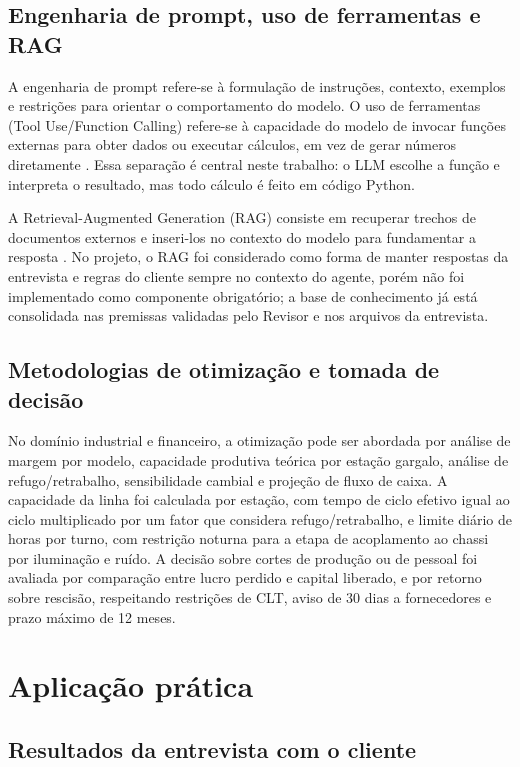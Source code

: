 \documentclass[12pt,a4paper,oneside,brazil]{abntex2}
\begin{document}
\section{Engenharia de prompt, uso de ferramentas e RAG}

A engenharia de prompt refere-se à formulação de instruções, contexto, exemplos e restrições para orientar o comportamento do modelo. O uso de ferramentas (Tool Use/Function Calling) refere-se à capacidade do modelo de invocar funções externas para obter dados ou executar cálculos, em vez de gerar números diretamente \cite{schick2023toolformer}. Essa separação é central neste trabalho: o LLM escolhe a função e interpreta o resultado, mas todo cálculo é feito em código Python.

A Retrieval-Augmented Generation (RAG) consiste em recuperar trechos de documentos externos e inseri-los no contexto do modelo para fundamentar a resposta \cite{lewis2020retrieval}. No projeto, o RAG foi considerado como forma de manter respostas da entrevista e regras do cliente sempre no contexto do agente, porém não foi implementado como componente obrigatório; a base de conhecimento já está consolidada nas premissas validadas pelo Revisor e nos arquivos da entrevista.

\section{Metodologias de otimização e tomada de decisão}

No domínio industrial e financeiro, a otimização pode ser abordada por análise de margem por modelo, capacidade produtiva teórica por estação gargalo, análise de refugo/retrabalho, sensibilidade cambial e projeção de fluxo de caixa. A capacidade da linha foi calculada por estação, com tempo de ciclo efetivo igual ao ciclo multiplicado por um fator que considera refugo/retrabalho, e limite diário de horas por turno, com restrição noturna para a etapa de acoplamento ao chassi por iluminação e ruído. A decisão sobre cortes de produção ou de pessoal foi avaliada por comparação entre lucro perdido e capital liberado, e por retorno sobre rescisão, respeitando restrições de CLT, aviso de 30 dias a fornecedores e prazo máximo de 12 meses.

\chapter{Aplicação prática}
\section{Resultados da entrevista com o cliente}
\end{document}
